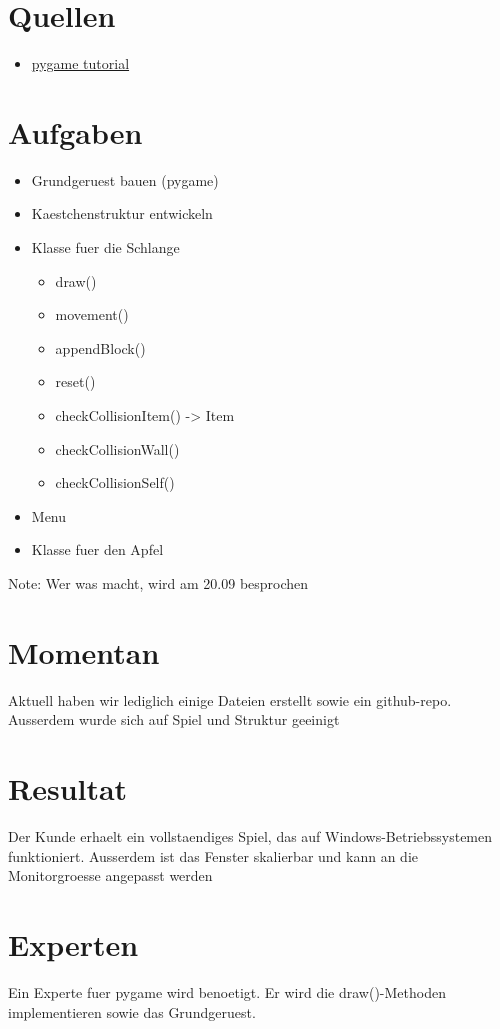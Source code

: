 \documentclass[11pt]{article}
\begin{document}
\section{Quellen}
\label{sec:org08704c9}
\begin{itemize}
\item \href{https://www.python-lernen.de/pygame-tutorial.htm}{pygame tutorial}
\end{itemize}
\section{Aufgaben}
\label{sec:orgefb77ce}
\begin{itemize}
\item Grundgeruest bauen (pygame)
\item Kaestchenstruktur entwickeln
\item Klasse fuer die Schlange
\begin{itemize}
\item draw()
\item movement()
\item appendBlock()
\item reset()
\item checkCollisionItem() -> Item
\item checkCollisionWall()
\item checkCollisionSelf()
\end{itemize}
\item Menu
\item Klasse fuer den Apfel
\end{itemize}
Note: Wer was macht, wird am 20.09 besprochen

\section{Momentan}
\label{sec:org53c693d}
Aktuell haben wir lediglich einige Dateien erstellt sowie ein github-repo. Ausserdem wurde sich auf Spiel und Struktur geeinigt
\section{Resultat}
\label{sec:org9786c06}
Der Kunde erhaelt ein vollstaendiges Spiel, das auf Windows-Betriebssystemen funktioniert. Ausserdem ist das Fenster skalierbar und kann an die Monitorgroesse angepasst werden
\section{Experten}
\label{sec:org4ebde35}
Ein Experte fuer pygame wird benoetigt. Er wird die draw()-Methoden implementieren sowie das Grundgeruest.
\end{document}
